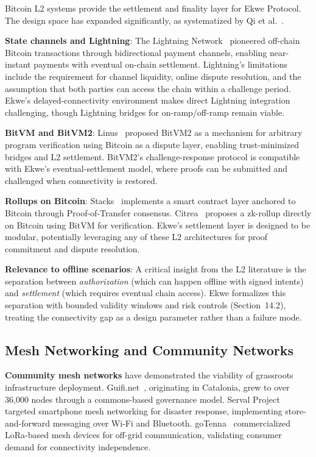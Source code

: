 \documentclass[11pt,a4paper]{article}
\begin{document}
Bitcoin L2 systems provide the settlement and finality layer for Ekwe Protocol. The design space has expanded significantly, as systematized by Qi et al.~\cite{sok_btc_l2}.

\textbf{State channels and Lightning}: The Lightning Network~\cite{poon_lightning} pioneered off-chain Bitcoin transactions through bidirectional payment channels, enabling near-instant payments with eventual on-chain settlement. Lightning's limitations include the requirement for channel liquidity, online dispute resolution, and the assumption that both parties can access the chain within a challenge period. Ekwe's delayed-connectivity environment makes direct Lightning integration challenging, though Lightning bridges for on-ramp/off-ramp remain viable.

\textbf{BitVM and BitVM2}: Linus~\cite{bitvm2} proposed BitVM2 as a mechanism for arbitrary program verification using Bitcoin as a dispute layer, enabling trust-minimized bridges and L2 settlement. BitVM2's challenge-response protocol is compatible with Ekwe's eventual-settlement model, where proofs can be submitted and challenged when connectivity is restored.

\textbf{Rollups on Bitcoin}: Stacks~\cite{stacks} implements a smart contract layer anchored to Bitcoin through Proof-of-Transfer consensus. Citrea~\cite{citrea} proposes a zk-rollup directly on Bitcoin using BitVM for verification. Ekwe's settlement layer is designed to be modular, potentially leveraging any of these L2 architectures for proof commitment and dispute resolution.

\textbf{Relevance to offline scenarios}: A critical insight from the L2 literature is the separation between \textit{authorization} (which can happen offline with signed intents) and \textit{settlement} (which requires eventual chain access). Ekwe formalizes this separation with bounded validity windows and risk controls (Section~14.2), treating the connectivity gap as a design parameter rather than a failure mode.

\subsection{Mesh Networking and Community Networks}

\textbf{Community mesh networks} have demonstrated the viability of grassroots infrastructure deployment. Guifi.net~\cite{guifi}, originating in Catalonia, grew to over 36,000 nodes through a commons-based governance model. Serval Project~\cite{serval} targeted smartphone mesh networking for disaster response, implementing store-and-forward messaging over Wi-Fi and Bluetooth. goTenna~\cite{gotenna} commercialized LoRa-based mesh devices for off-grid communication, validating consumer demand for connectivity independence.
\end{document}
